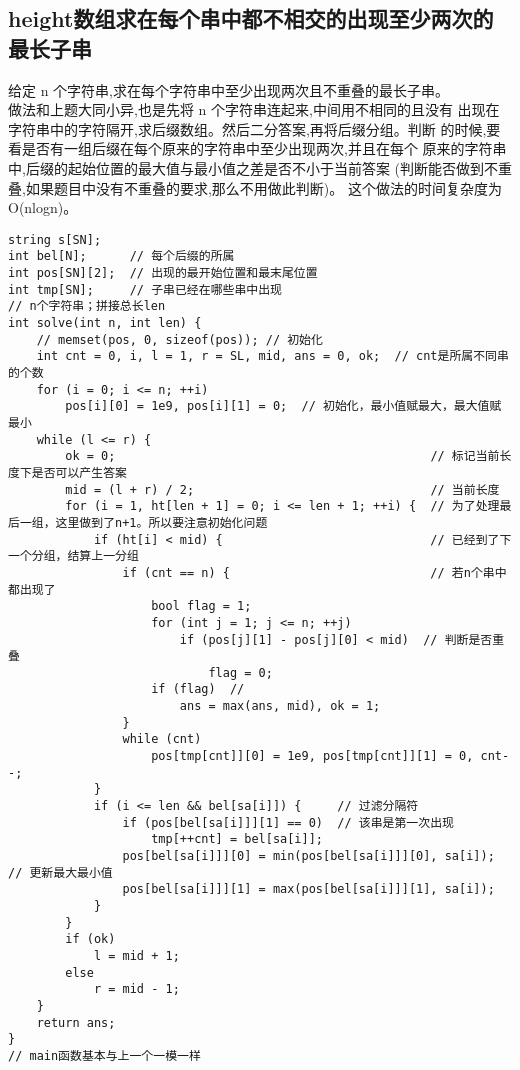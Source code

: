     \subsection{height数组求在每个串中都不相交的出现至少两次的最长子串}
        给定 n 个字符串,求在每个字符串中至少出现两次且不重叠的最长子串。\\
        做法和上题大同小异,也是先将 n 个字符串连起来,中间用不相同的且没有
        出现在字符串中的字符隔开,求后缀数组。然后二分答案,再将后缀分组。判断
        的时候,要看是否有一组后缀在每个原来的字符串中至少出现两次,并且在每个
        原来的字符串中,后缀的起始位置的最大值与最小值之差是否不小于当前答案
        (判断能否做到不重叠,如果题目中没有不重叠的要求,那么不用做此判断)。
        这个做法的时间复杂度为 O(nlogn)。
\begin{lstlisting}
string s[SN];
int bel[N];      // 每个后缀的所属
int pos[SN][2];  // 出现的最开始位置和最末尾位置
int tmp[SN];     // 子串已经在哪些串中出现
// n个字符串；拼接总长len
int solve(int n, int len) {
    // memset(pos, 0, sizeof(pos)); // 初始化
    int cnt = 0, i, l = 1, r = SL, mid, ans = 0, ok;  // cnt是所属不同串的个数
    for (i = 0; i <= n; ++i)
        pos[i][0] = 1e9, pos[i][1] = 0;  // 初始化，最小值赋最大，最大值赋最小
    while (l <= r) {
        ok = 0;                                            // 标记当前长度下是否可以产生答案
        mid = (l + r) / 2;                                 // 当前长度
        for (i = 1, ht[len + 1] = 0; i <= len + 1; ++i) {  // 为了处理最后一组，这里做到了n+1。所以要注意初始化问题
            if (ht[i] < mid) {                             // 已经到了下一个分组，结算上一分组
                if (cnt == n) {                            // 若n个串中都出现了
                    bool flag = 1;
                    for (int j = 1; j <= n; ++j)
                        if (pos[j][1] - pos[j][0] < mid)  // 判断是否重叠
                            flag = 0;
                    if (flag)  //
                        ans = max(ans, mid), ok = 1;
                }
                while (cnt)
                    pos[tmp[cnt]][0] = 1e9, pos[tmp[cnt]][1] = 0, cnt--;
            }
            if (i <= len && bel[sa[i]]) {     // 过滤分隔符
                if (pos[bel[sa[i]]][1] == 0)  // 该串是第一次出现
                    tmp[++cnt] = bel[sa[i]];
                pos[bel[sa[i]]][0] = min(pos[bel[sa[i]]][0], sa[i]);  // 更新最大最小值
                pos[bel[sa[i]]][1] = max(pos[bel[sa[i]]][1], sa[i]);
            }
        }
        if (ok)
            l = mid + 1;
        else
            r = mid - 1;
    }
    return ans;
}
// main函数基本与上一个一模一样
\end{lstlisting}
